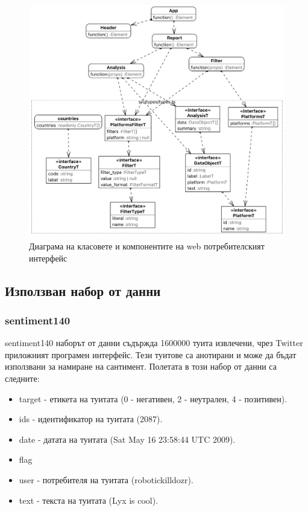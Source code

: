 \documentclass{article}
\begin{document}
\begin{figure}[H]
  \centering
  \captionsetup{justification=centering}
  \includegraphics[width=450px, keepaspectratio]{chapter-04/frontend.png}
  \caption{Диаграма на класовете и компонентите на web потребителският интерфейс}
\end{figure}

\subsection{Използван набор от данни}
\label{sec:dataset}

\subsubsection{sentiment140}

sentiment140 наборът от данни съдържда 1600000 туита извлечени, чрез Twitter приложният програмен интерфейс. Тези
туитове са анотирани и може да бъдат използвани за намиране на сантимент. Полетата в този набор от данни са следните:

\begin{itemize}

  \item target - етикета на туитата (0 - негативен, 2 - неутрален, 4 - позитивен).
  \item ids - идентификатор на туитата (2087).
  \item date - датата на туитата (Sat May 16 23:58:44 UTC 2009).
  \item flag
  \item user - потребителя на туитата (robotickilldozr).
  \item text - текста на туитата (Lyx is cool). \cite{sentiment140}

\end{itemize}
\end{document}
